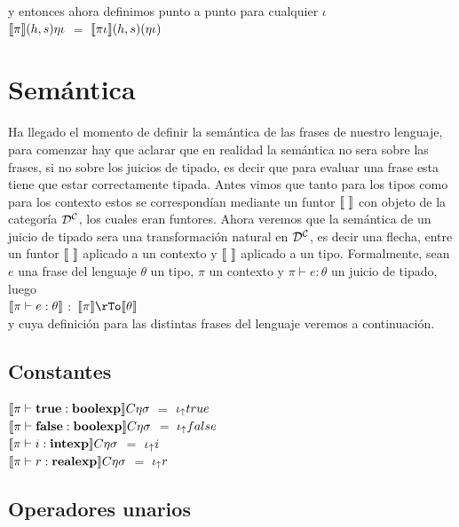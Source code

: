 \noindent
y entonces ahora definimos punto a punto para cualquier $\iota$\\

\noindent
$\llbracket \pi \rrbracket(h,s)\eta\iota$ $=$ $\llbracket \pi \iota \rrbracket(h,s)(\eta\iota)$

\section{Sem\'antica}

Ha llegado el momento de definir la sem\'antica de las frases de nuestro lenguaje,
para comenzar hay que aclarar que en realidad la sem\'antica no sera sobre
las frases, si no sobre los juicios de tipado, es decir que para evaluar una frase
esta tiene que estar correctamente tipada. Antes vimos que tanto para los tipos
como para los contexto estos se correspond\'ian mediante un funtor $\semBrcks{ \ }$
con objeto de la categor\'ia ${\mathcal{D}}^{\mathcal{C}}$, los cuales eran funtores. Ahora veremos que
la sem\'antica de un juicio de tipado sera una transformaci\'on natural en ${\mathcal{D}}^{\mathcal{C}}$,
es decir una flecha, entre un funtor $\semBrcks{ \ }$ aplicado a un contexto y
$\semBrcks{ \ }$ aplicado a un tipo. Formalmente, sean $e$ una frase del lenguaje
$\theta$ un tipo, $\pi$ un contexto y $\pi \vdash e : \theta$ un juicio de tipado, 
luego\\

\noindent
$\llbracket  \pi \vdash e : \theta  \rrbracket$ $:$ $\semBrcks{\pi} \rTo \semBrcks{\theta}$\\

\noindent
y cuya definici\'on para las distintas frases del lenguaje veremos a continuaci\'on.

\subsection{Constantes}

$\llbracket  \pi \vdash \textbf{true} : \textbf{boolexp}  \rrbracket C\eta\sigma$ $=$ $\iota_{\uparrow} true$\\

\noindent
$\llbracket  \pi \vdash \textbf{false} : \textbf{boolexp}  \rrbracket C\eta\sigma$ $=$ $\iota_{\uparrow} false$\\

\noindent
$\llbracket  \pi \vdash i : \textbf{intexp}  \rrbracket C\eta\sigma$ $=$ $\iota_{\uparrow} i$\\

\noindent
$\llbracket  \pi \vdash r : \textbf{realexp}  \rrbracket C\eta\sigma$ $=$ $\iota_{\uparrow} r$\\

\subsection{Operadores unarios}

